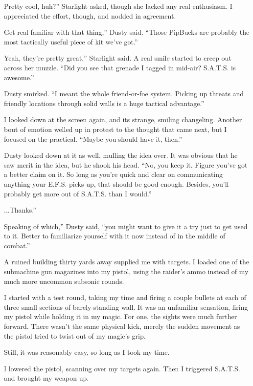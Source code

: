 \leavevmode{}Pretty cool, huh?” Starlight asked, though she lacked any real enthusiasm. I appreciated the effort, though, and nodded in agreement.

\leavevmode{}Get real familiar with that thing,” Dusty said. “Those PipBucks are probably the most tactically useful piece of kit we’ve got.”

\leavevmode{}Yeah, they’re pretty great,” Starlight said. A real smile started to creep out across her muzzle. “Did you see that grenade I tagged in mid-air? S.A.T.S. is awesome.”

Dusty smirked. “I meant the whole friend-or-foe system. Picking up threats and friendly locations through solid walls is a huge tactical advantage.”

I looked down at the screen again, and its strange, smiling changeling. Another bout of emotion welled up in protest to the thought that came next, but I focused on the practical. “Maybe you should have it, then.”

Dusty looked down at it as well, mulling the idea over. It was obvious that he saw merit in the idea, but he shook his head. “No, you keep it. Figure you’ve got a better claim on it. So long as you’re quick and clear on communicating anything your E.F.S. picks up, that should be good enough. Besides, you’ll probably get more out of S.A.T.S. than I would.”

\leavevmode{}...Thanks.”

\leavevmode{}Speaking of which,” Dusty said, “you might want to give it a try just to get used to it. Better to familiarize yourself with it now instead of in the middle of combat.”

A ruined building thirty yards away supplied me with targets. I loaded one of the submachine gun magazines into my pistol, using the raider’s ammo instead of my much more uncommon subsonic rounds.

I started with a test round, taking my time and firing a couple bullets at each of three small sections of barely-standing wall. It was an unfamiliar sensation, firing my pistol while holding it in my magic. For one, the sights were much further forward. There wasn’t the same physical kick, merely the sudden movement as the pistol tried to twist out of my magic’s grip.

Still, it was reasonably easy, so long as I took my time.

I lowered the pistol, scanning over my targets again. Then I triggered S.A.T.S. and brought my weapon up.

